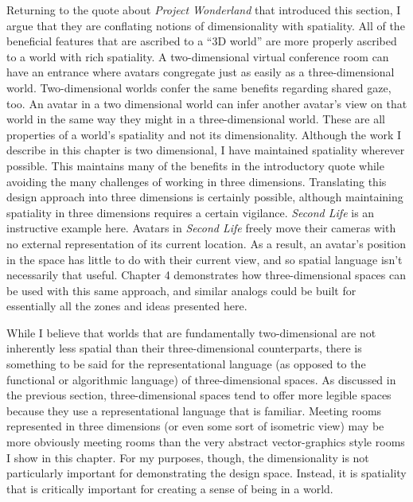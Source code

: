 Returning to the quote about \emph{Project Wonderland} that introduced this section, I argue that they are conflating notions of dimensionality with spatiality. All of the beneficial features that are ascribed to a ``3D world'' are more properly ascribed to a world with rich spatiality. A two-dimensional virtual conference room can have an entrance where avatars congregate just as easily as a three-dimensional world. Two-dimensional worlds confer the same benefits regarding shared gaze, too. An avatar in a two dimensional world can infer another avatar's view on that world in the same way they might in a three-dimensional world. These are all properties of a world's spatiality and not its dimensionality. Although the work I describe in this chapter is two dimensional, I have maintained spatiality wherever possible. This maintains many of the benefits in the introductory quote while avoiding the many challenges of working in three dimensions. Translating this design approach into three dimensions is certainly possible, although maintaining spatiality in three dimensions requires a certain vigilance. \emph{Second Life} is an instructive example here. Avatars in \emph{Second Life} freely move their cameras with no external representation of its current location. As a result, an avatar's position in the space has little to do with their current view, and so spatial language isn't necessarily that useful.  Chapter 4 demonstrates how three-dimensional spaces can be used with this same approach, and similar analogs could be built for essentially all the zones and ideas presented here.

While I believe that worlds that are fundamentally two-dimensional are not inherently less spatial than their three-dimensional counterparts, there is something to be said for the representational language (as opposed to the functional or algorithmic language) of three-dimensional spaces. As discussed in the previous section, three-dimensional spaces tend to offer more legible spaces because they use a representational language that is familiar. Meeting rooms represented in three dimensions (or even some sort of isometric view) may be more obviously meeting rooms than the very abstract vector-graphics style rooms I show in this chapter. For my purposes, though, the dimensionality is not particularly important for demonstrating the design space. Instead, it is spatiality that is critically important for creating a sense of being in a world.


